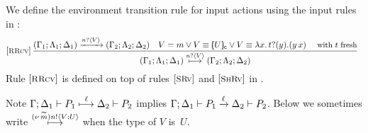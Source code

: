 \begin{definition}
	\label{def:rlts}
	We define the environment transition rule for input actions 
	using the input rules in :
	\[ \!\!\!
	\begin{array}{l}
			
						\eltsrule{RRcv}\,\tree {
	(\Gamma_1; \Lambda_1; \Delta_1) \by{\bactinp{n}{V}} (\Gamma_2; \Lambda_2; \Delta_2)
	\quad
					V = m 
					\vee  V \scong \omapchar{U}%
										\vee V  \scong \abs{{x}}{\binp{t}{y} (\appl{y}{{x}})}
					\text{ {\small with $t$ fresh}} 
			}{
				(\Gamma_1; \Lambda_1; \Delta_1) \hby{\bactinp{n}{V}} (\Gamma_2; \Lambda_2; \Delta_2)
			}
			
			
	\end{array}
	\]
	\noi Rule $\eltsrule{RRcv}$ is defined on top
	of rules $\eltsrule{SRv}$ and $\eltsrule{ShRv}$
	in .
\end{definition}

\smallskip 

\noi Note 
$\Gamma; \Delta_1 \vdash P_1 \stackrel{\ell}{\longmapsto} \Delta_2 \vdash P_2$ implies  
$\Gamma; \Delta_1 \vdash P_1 \xrightarrow{\ell} \Delta_2 \vdash P_2$.
Below we sometimes write  
$\stackrel{(\nu\, \widetilde{m}) n ! \langle V : U \rangle}{\longmapsto}$
when the type of $V$ is~$U$.

